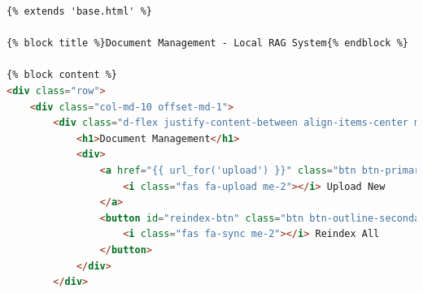 \documentclass[
  screen,review,acmlarge]{acmart}
\begin{document}
\begin{lstlisting}[language=HTML]
{% extends 'base.html' %}

{% block title %}Document Management - Local RAG System{% endblock %}

{% block content %}
<div class="row">
    <div class="col-md-10 offset-md-1">
        <div class="d-flex justify-content-between align-items-center mb-4">
            <h1>Document Management</h1>
            <div>
                <a href="{{ url_for('upload') }}" class="btn btn-primary">
                    <i class="fas fa-upload me-2"></i> Upload New
                </a>
                <button id="reindex-btn" class="btn btn-outline-secondary ms-2">
                    <i class="fas fa-sync me-2"></i> Reindex All
                </button>
            </div>
        </div>
        

\end{lstlisting}
\end{document}
